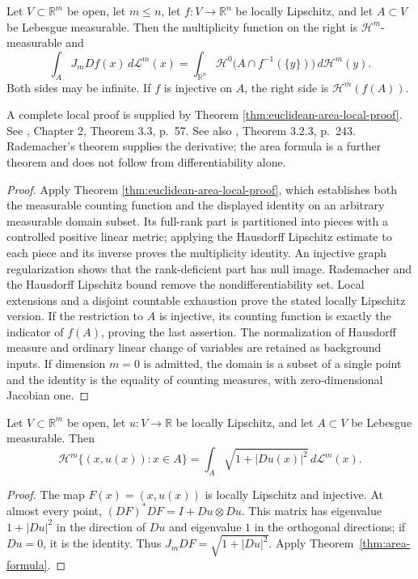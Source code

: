 \begin{theorem}\label{thm:area-formula}
Let $V\subset\mathbb{R}^m$ be open, let $m\leq n$, let $f:V\to\mathbb{R}^n$ be locally Lipschitz, and let $A\subset V$ be Lebesgue measurable. Then the multiplicity function on the right is $\mathcal{H}^m$-measurable and
\[
 \int_A J_mDf(x)\,d\mathcal{L}^m(x)
 =\int_{\mathbb{R}^n}\mathcal{H}^0\bigl(A\cap f^{-1}(\{y\})\bigr)\,d\mathcal{H}^m(y).
\]
Both sides may be infinite. If $f$ is injective on $A$, the right side is $\mathcal{H}^m(f(A))$.

A complete local proof is supplied by Theorem \ref{thm:euclidean-area-local-proof}. See \cite{Sim18}, Chapter 2, Theorem 3.3, p.~57. See also \cite{Fed69}, Theorem 3.2.3, p.~243. Rademacher's theorem supplies the derivative; the area formula is a further theorem and does not follow from differentiability alone.
\end{theorem}
\begin{proof}
Apply Theorem \ref{thm:euclidean-area-local-proof}, which establishes both the measurable counting function and the displayed identity on an arbitrary measurable domain subset. Its full-rank part is partitioned into pieces with a controlled positive linear metric; applying the Hausdorff Lipschitz estimate to each piece and its inverse proves the multiplicity identity. An injective graph regularization shows that the rank-deficient part has null image. Rademacher and the Hausdorff Lipschitz bound remove the nondifferentiability set. Local extensions and a disjoint countable exhaustion prove the stated locally Lipschitz version. If the restriction to $A$ is injective, its counting function is exactly the indicator of $f(A)$, proving the last assertion. The normalization of Hausdorff measure and ordinary linear change of variables are retained as background inputs. If dimension $m=0$ is admitted, the domain is a subset of a single point and the identity is the equality of counting measures, with zero-dimensional Jacobian one.
\end{proof}

\begin{corollary}\label{cor:graph-area}
Let $V\subset\mathbb{R}^m$ be open, let $u:V\to\mathbb{R}$ be locally Lipschitz, and let $A\subset V$ be Lebesgue measurable. Then
\[
 \mathcal{H}^m\{(x,u(x)):x\in A\}
 =\int_A\sqrt{1+|Du(x)|^2}\,d\mathcal{L}^m(x).
\]
\end{corollary}
\begin{proof}
The map $F(x)=(x,u(x))$ is locally Lipschitz and injective. At almost every point,
$(DF)^*DF=I+Du\otimes Du$. This matrix has eigenvalue $1+|Du|^2$ in the direction of $Du$ and eigenvalue $1$ in the orthogonal directions; if $Du=0$, it is the identity. Thus $J_mDF=\sqrt{1+|Du|^2}$. Apply Theorem~\ref{thm:area-formula}.
\end{proof}

